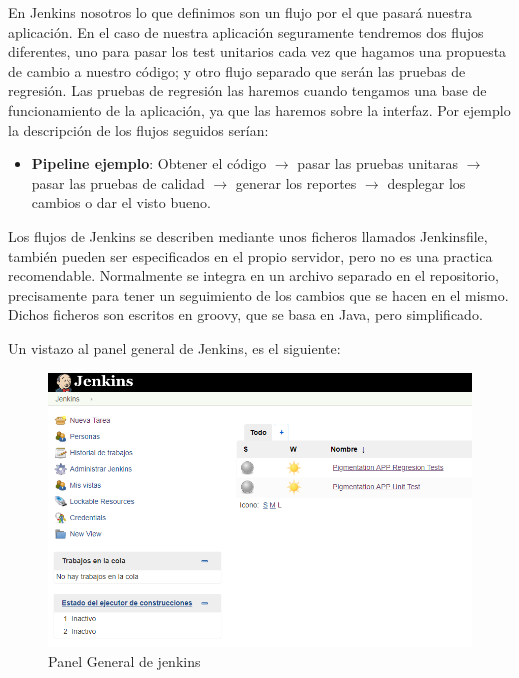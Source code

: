 En Jenkins nosotros lo que definimos son un flujo por el que pasará nuestra aplicación. En el caso de nuestra aplicación seguramente tendremos dos flujos diferentes, uno para pasar los test unitarios cada vez que hagamos una propuesta de cambio a nuestro código; y otro flujo separado que serán las pruebas de regresión. Las pruebas de regresión las haremos cuando tengamos una base de funcionamiento de la aplicación, ya que las haremos sobre la interfaz. Por ejemplo la descripción de los flujos seguidos serían:

\begin{itemize}
    \item \textbf{Pipeline ejemplo}: Obtener el código $\rightarrow$ pasar las pruebas unitaras $\rightarrow$ pasar las pruebas de calidad $\rightarrow$ generar los reportes $\rightarrow$ desplegar los cambios o dar el visto bueno.
\end{itemize}

Los flujos de Jenkins se describen mediante unos ficheros llamados Jenkinsfile, también pueden ser especificados en el propio servidor, pero no es una practica recomendable. Normalmente se integra en un archivo separado en el repositorio, precisamente para tener un seguimiento de los cambios que se hacen en el mismo. Dichos ficheros son escritos en groovy, que se basa en Java, pero simplificado. 

Un vistazo al panel general de Jenkins, es el siguiente:

\begin{figure}[H]
    \centering
    \includegraphics[scale=0.7]{imagenes/fundamentosHerramientas/mainJenkins.png}
    \caption{Panel General de jenkins}
    \label{fig:mainJenkins}
\end{figure}


